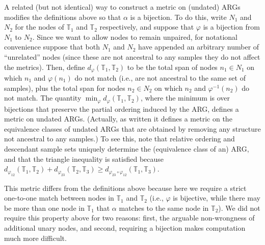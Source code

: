 \documentclass[10pt,twoside,lineno]{gsajnl}
\newcommand{\T}{\mathbb{T}}
\begin{document}
A related (but not identical) way to construct a metric on (undated) ARGs
modifies the definitions above so that $\alpha$ is a bijection.
To do this, write $N_1$ and $N_2$ for the nodes of $\T_1$ and $\T_2$ respectively,
and suppose that $\varphi$ is a bijection from $N_1$ to $N_2$.
Since we want to allow nodes to remain unpaired,
for notational convenience suppose that both $N_1$ and $N_2$ have appended an arbitrary
number of ``unrelated'' nodes (since these are not ancestral to any samples they do not affect the metrics).
Then, define $d_\varphi(\T_1,\T_2)$ to be the total span of nodes $n_1 \in N_1$
on which $n_1$ and $\varphi(n_1)$ do not match (i.e., are not ancestral to the same set of samples),
plus the total span for nodes $n_2 \in N_2$ on which $n_2$ and $\varphi^{-1}(n_2)$ do not match.
The quantity $\min_\varphi d_\varphi(\T_1,\T_2)$,
where the minimum is over bijections that preserve the partial ordering induced by the ARG,
defines a metric on undated ARGs.
(Actually, as written it defines a metric on the equivalence classes of undated ARGs
that are obtained by removing any structure not ancestral to any samples.)
To see this, note that
relative ordering and descendant sample sets uniquely determine the (equivalence class of an) ARG,
and that the triangle inequality is satisfied because
$d_{\varphi_{12}}(\T_1,\T_2) + d_{\varphi_{23}}(\T_2,\T_3) \ge d_{\varphi_{23}\circ\varphi_{12}}(\T_1,\T_3)$.

This metric differs from the definitions above because here
we require a strict one-to-one match between nodes in $\T_1$ and $\T_2$
(i.e., $\varphi$ is bijective, while there may be more than one node in $\T_1$
that $\alpha$ matches to the same node in $\T_2$).
We did not require this property above for two reasons:
first, the arguable non-wrongness of additional unary nodes,
and second, requiring a bijection makes computation much more difficult.
\end{document}
